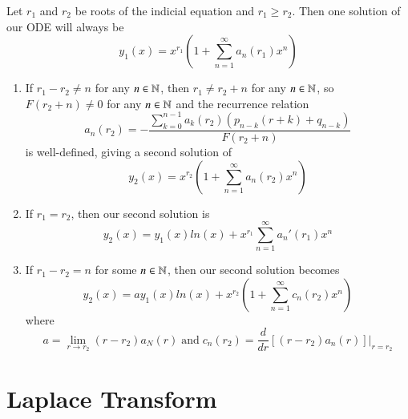 \documentclass[12pt, a4paper, oneside, openright, titlepage]{book}
\begin{document}
\begin{thm}
        Let $r_1$ and $r_2$ be roots of the indicial equation and $r_1 \geq r_2$. Then one solution of our ODE will always be \begin{equation}
                y_1(x) = x^{r_1}\left(1 + \sum\limits_{n=1}^{\infty}a_n(r_1)x^n\right)
        \end{equation}
        \begin{enumerate}
                \item If $r_1 - r_2 \neq n$ for any $n \in \mathbb N$, then $r_1 \neq r_2 + n$ for any $n \in \mathbb N$, so $F(r_2 + n) \neq 0$ for any $n \in \mathbb N$ and the recurrence relation \begin{equation}
                a_n(r_2) = -\frac{\sum\limits_{k=0}^{n-1}a_k(r_2)(p_{n-k}(r+k)+q_{n-k})}{F(r_2+n)}
                \end{equation}
                is well-defined, giving a second solution of \begin{equation}
                        y_2(x) = x^{r_2}\left(1 + \sum\limits_{n=1}^{\infty}a_n(r_2)x^n\right)
                \end{equation}
                \item If $r_1 = r_2$, then our second solution is \begin{equation}
                                y_2(x) = y_1(x)ln(x) + x^{r_1}\sum\limits_{n=1}^{\infty}a_n'(r_1)x^n                      
                        \end{equation}
                \item If $r_1 - r_2 = n$ for some $n \in \mathbb N$, then our second solution becomes \begin{equation}
                                y_2(x) = ay_1(x)ln(x) + x^{r_2}\left(1 + \sum\limits_{n=1}^{\infty}c_n(r_2)x^n\right)
                        \end{equation}
                        where \begin{equation}
                                a =\lim\limits_{r \rightarrow r_2}(r-r_2)a_N(r)\;\text{and}\;c_n(r_2)=\frac{d}{dr}\left[(r-r_2)a_n(r)\right]\bigg\rvert_{r=r_2}
                        \end{equation}
        \end{enumerate}
\end{thm}




\clearpage

\chapter{Laplace Transform}
\end{document}
